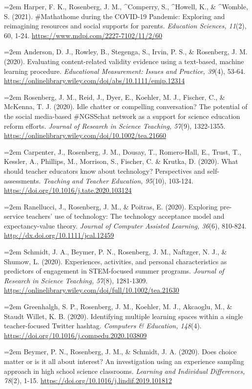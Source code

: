 \documentclass[
  14,
]{article}
\begin{document}
\hangindent=2em Harper, F. K., Rosenberg, J. M., \^{}Comperry, S.,
\^{}Howell, K., \& \^{}Womble, S. (2021). \#Mathathome during the
COVID-19 Pandemic: Exploring and reimagining resources and social
supports for parents. \emph{Education Sciences, 11}(2), 60, 1-24.
\url{https://www.mdpi.com/2227-7102/11/2/60}

\hangindent=2em Anderson, D. J., Rowley, B., Stegenga, S., Irvin, P. S.,
\& Rosenberg, J. M. (2020). Evaluating content-related validity evidence
using a text-based, machine learning procedure. \emph{Educational
Measurement: Issues and Practice, 39}(4), 53-64.
\url{https://onlinelibrary.wiley.com/doi/abs/10.1111/emip.12314}

\hangindent=2em Rosenberg, J. M., Reid, J., Dyer, E., Koehler, M. J.,
Fischer, C., \& McKenna, T. J. (2020). Idle chatter or compelling
conversation? The potential of the social media-based \#NGSSchat network
as a support for science education reform efforts. \emph{Journal of
Research in Science Teaching, 57}(9), 1322-1355.
\url{https://onlinelibrary.wiley.com/doi/10.1002/tea.21660}

\hangindent=2em Carpenter, J., Rosenberg, J. M., Dousay, T.,
Romero-Hall, E., Trust, T., Kessler, A., Phillips, M., Morrison, S.,
Fischer, C. \& Krutka, D. (2020). What should teacher educators know
about technology? Perspectives and self-assessments. \emph{Teaching and
Teacher Education, 95}(10), 103-124.
\url{https://doi.org/10.1016/j.tate.2020.103124}

\hangindent=2em Ranellucci, J., Rosenberg, J. M., \& Poitras, E. (2020).
Exploring pre-service teachers' use of technology: The technology
acceptance model and expectancy-value theory. \emph{Journal of Computer
Assisted Learning, 36}(6), 810-824.
\url{http://dx.doi.org/10.1111/jcal.12459}

\hangindent=2em Schmidt, J. A., Beymer, P. N., Rosenberg, J. M.,
Naftzger, N. J., \& Shumow, L. (2020). Experiences, activities, and
personal characteristics as predictors of engagement in STEM-focused
summer programs. \emph{Journal of Research in Science Teaching, 57}(8),
1281-1309.
\url{https://onlinelibrary.wiley.com/doi/full/10.1002/tea.21630}

\hangindent=2em Greenhalgh, S. P., Rosenberg, J. M., Koehler, M. J.,
Akcaoglu, M., \& Staudt Willet, K. B. (2020). Identifying multiple
learning spaces within a single teacher-focused Twitter hashtag.
\emph{Computers \& Education, 148}(4).
\url{https://doi.org/10.1016/j.compedu.2020.103809}

\hangindent=2em Beymer, P. N., Rosenberg, J. M., \& Schmidt, J. A.
(2020). Does choice matter or is it all about interest? An investigation
using an experience sampling approach in high school science classrooms.
\emph{Learning and Individual Differences, 78}(2), 1-15.
\url{https://doi.org/10.1016/j.lindif.2019.101812}
\end{document}
